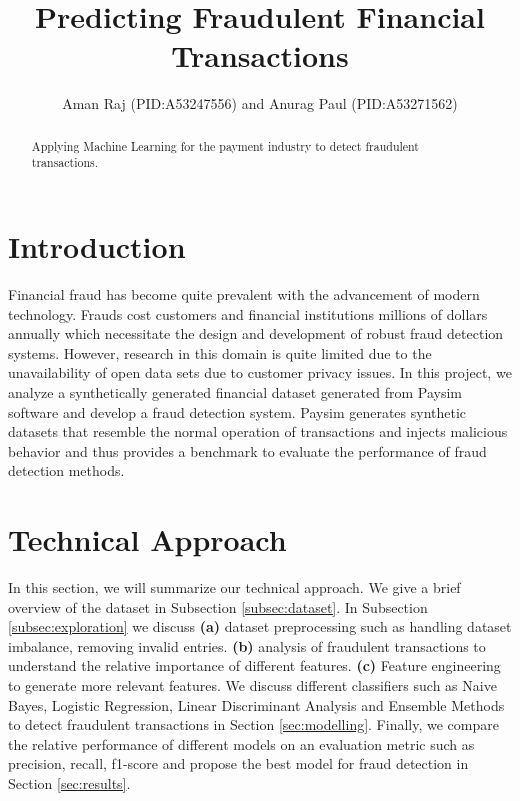 \documentclass[letterpaper, 12 pt, conference]{ieeeconf}  %
\title{\LARGE \bf
Predicting Fraudulent Financial Transactions
}
\author{Aman Raj (PID:A53247556) and Anurag Paul (PID:A53271562)}
\begin{document}
\maketitle
\thispagestyle{empty}
\pagestyle{empty}


\begin{abstract}

Applying Machine Learning for the payment industry to detect fraudulent transactions.

\end{abstract}


\section{Introduction}

Financial fraud has become quite prevalent with the advancement of modern technology. Frauds cost customers and financial institutions millions of dollars annually which necessitate the design and development of robust fraud detection systems. However, research in this domain is quite limited due to the unavailability of open data sets due to customer privacy issues. In this project, we analyze a synthetically generated financial dataset
generated from Paysim \cite{paysim} software and develop a fraud detection system. Paysim generates synthetic datasets that resemble the normal operation of transactions and injects malicious behavior and thus provides a benchmark to evaluate the performance of fraud detection methods.

\section{Technical Approach}
In this section, we will summarize our technical approach. We give a brief overview of the dataset in Subsection \ref{subsec:dataset}. In Subsection \ref{subsec:exploration} we discuss \textbf{(a)} dataset preprocessing such as handling dataset imbalance, removing invalid entries. \textbf{(b)} analysis of fraudulent transactions to understand the relative importance of different features. \textbf{(c)} Feature engineering to generate more relevant features. We discuss different classifiers such as Naive Bayes, Logistic Regression, Linear Discriminant Analysis and Ensemble Methods to detect fraudulent transactions in Section \ref{sec:modelling}. Finally, we compare the relative performance of different models on an evaluation metric such as precision, recall, f1-score and propose the best model for fraud detection in Section \ref{sec:results}.
\end{document}
